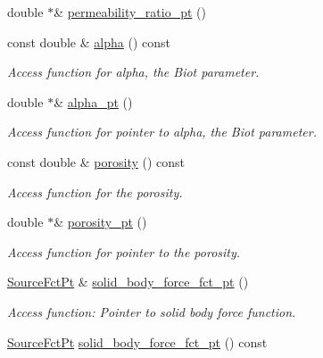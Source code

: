 \begin{DoxyCompactItemize}
double $\ast$\& \hyperlink{classoomph_1_1AxisymmetricPoroelasticityEquations_a58aa8cf5415562e37884fc8a5304803f}{permeability\+\_\+ratio\+\_\+pt} ()
\item 
const double \& \hyperlink{classoomph_1_1AxisymmetricPoroelasticityEquations_acde1907eed1f77a11184d71adaa89e76}{alpha} () const
\begin{DoxyCompactList}\small\item\em Access function for alpha, the Biot parameter. \end{DoxyCompactList}\item 
double $\ast$\& \hyperlink{classoomph_1_1AxisymmetricPoroelasticityEquations_ab153afbf3149fb43be60a72a57584ff1}{alpha\+\_\+pt} ()
\begin{DoxyCompactList}\small\item\em Access function for pointer to alpha, the Biot parameter. \end{DoxyCompactList}\item 
const double \& \hyperlink{classoomph_1_1AxisymmetricPoroelasticityEquations_a2c9be6018e209653e76552a5d3a83f78}{porosity} () const
\begin{DoxyCompactList}\small\item\em Access function for the porosity. \end{DoxyCompactList}\item 
double $\ast$\& \hyperlink{classoomph_1_1AxisymmetricPoroelasticityEquations_a9ab90bff58911ea7f41e09d73ed8a60b}{porosity\+\_\+pt} ()
\begin{DoxyCompactList}\small\item\em Access function for pointer to the porosity. \end{DoxyCompactList}\item 
\hyperlink{classoomph_1_1AxisymmetricPoroelasticityEquations_a7a2c87557c3d9d405bb07a9f53bb4abe}{Source\+Fct\+Pt} \& \hyperlink{classoomph_1_1AxisymmetricPoroelasticityEquations_a223f14c324b6f163c02585b4b3e25ba1}{solid\+\_\+body\+\_\+force\+\_\+fct\+\_\+pt} ()
\begin{DoxyCompactList}\small\item\em Access function\+: Pointer to solid body force function. \end{DoxyCompactList}\item 
\hyperlink{classoomph_1_1AxisymmetricPoroelasticityEquations_a7a2c87557c3d9d405bb07a9f53bb4abe}{Source\+Fct\+Pt} \hyperlink{classoomph_1_1AxisymmetricPoroelasticityEquations_ab70f4de2bd58e382632cd805df108a15}{solid\+\_\+body\+\_\+force\+\_\+fct\+\_\+pt} () const

\end{DoxyCompactItemize}
